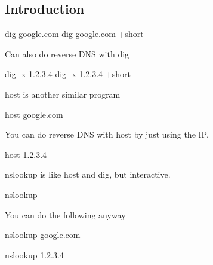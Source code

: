 
\subsection{Introduction}


dig google.com
dig google.com +short

Can also do reverse DNS with dig

dig -x 1.2.3.4
dig -x 1.2.3.4 +short


host is another similar program

host google.com

You can do reverse DNS with host by just using the IP.

host 1.2.3.4

nslookup is like host and dig, but interactive.

nslookup

You can do the following anyway

nslookup google.com

nslookup 1.2.3.4

